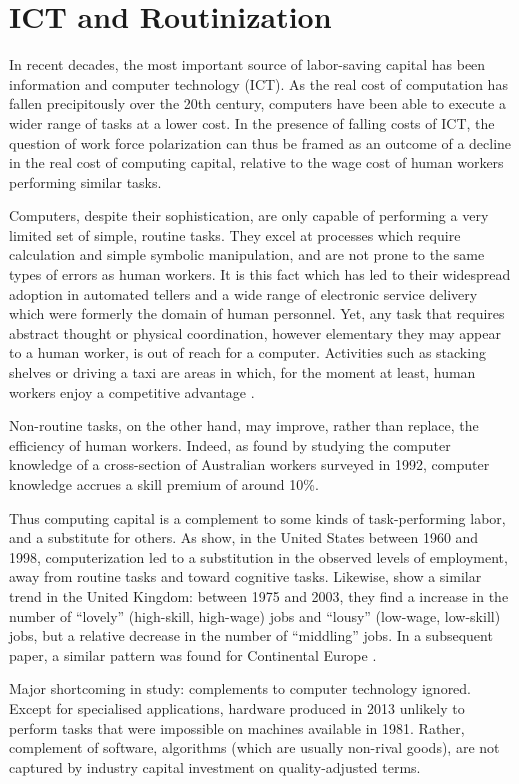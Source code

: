 \documentclass[a4paper,11pt]{article}
\begin{document}
\section{ICT and Routinization}

In recent decades, the most important source of labor-saving capital has been information and computer technology (ICT). As the real cost of computation has fallen precipitously over the 20th century, computers have been able to execute a wider range of tasks at a lower cost. In the presence of falling costs of ICT, the question of work force polarization can thus be framed as an outcome of a decline in the real cost of computing capital, relative to the wage cost of human workers performing similar tasks.

Computers, despite their sophistication, are only capable of performing a very limited set of simple, routine tasks. They excel at processes which require calculation and simple symbolic manipulation, and are not prone to the same types of errors as human workers. It is this fact which has led to their widespread adoption in automated tellers and a wide range of electronic service delivery which were formerly the domain of human personnel. Yet, any task that requires abstract thought or physical coordination, however elementary they may appear to a human worker, is out of reach for a computer. Activities such as stacking shelves or driving a taxi are areas in which, for the moment at least, human workers enjoy a competitive advantage \citet{Levy2003}. 

Non-routine tasks, on the other hand, may improve, rather than replace, the efficiency of human workers. Indeed, as \citet{Borland2004} found by studying the computer knowledge of a cross-section of Australian workers surveyed in 1992, computer knowledge accrues a skill premium of around 10\%.

Thus computing capital is a complement to some kinds of task-performing labor, and a substitute for others. As \citet{Levy2003} show, in the United States between 1960 and 1998, computerization led to a substitution in the observed levels of employment, away from routine tasks and toward cognitive tasks. Likewise, \citet{Goos2007} show a similar trend in the United Kingdom: between 1975 and 2003, they find a increase in the number of ``lovely'' (high-skill, high-wage) jobs and ``lousy'' (low-wage, low-skill) jobs, but a relative decrease in the number of ``middling'' jobs. In a subsequent paper, a similar pattern was found for Continental Europe \citep{Goos2009}.




Major shortcoming in study: complements to computer technology ignored. Except for specialised applications, hardware produced in 2013 unlikely to perform tasks that were impossible on machines available in 1981. Rather, complement of software, algorithms (which are usually non-rival goods), are not captured by industry capital investment on quality-adjusted terms.



\printbibliography
\end{document}
